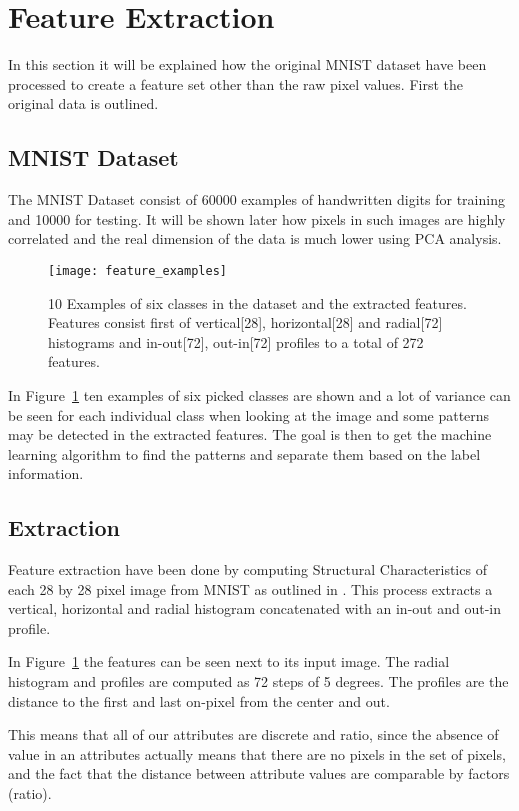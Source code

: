 \section{Feature Extraction}
In this section it will be explained how the original MNIST dataset have been processed to create a feature set other than the raw pixel values. First the original data is outlined.
\subsection{MNIST Dataset}
The MNIST Dataset consist of 60000 examples of handwritten digits for training and 10000 for testing. It will be shown later how pixels in such images are highly correlated and the real dimension of the data is much lower using PCA analysis.


\begin{figure}[hbtp]
\centering
\texttt{[image: feature\_examples]}
\caption{10 Examples of six classes in the dataset and the extracted features. Features consist first of vertical[28], horizontal[28] and radial[72] histograms and in-out[72], out-in[72] profiles to a total of 272 features. \label{fig:image_examples}}
\end{figure}

In Figure~\ref{fig:image_examples} ten examples of six picked classes are shown and a lot of variance can be seen for each individual class when looking at the image and some patterns may be detected in the extracted features. The goal is then to get the machine learning algorithm to find the patterns and separate them based on the label information.
\subsection{Extraction}
Feature extraction have been done by computing Structural Characteristics of each 28 by 28 pixel image from MNIST as outlined in \cite{1227727}. This process extracts a vertical, horizontal and radial histogram concatenated with an in-out and out-in profile.

In Figure~\ref{fig:image_examples} the features can be seen next to its input image. The radial histogram and profiles are computed as 72 steps of 5 degrees. The profiles are the distance to the first and last on-pixel from the center and out. 

This means that all of our attributes are discrete and ratio, since the absence of value in an attributes actually means that there are no pixels in the set of pixels, and the fact that the distance between attribute values are comparable by factors (ratio).
